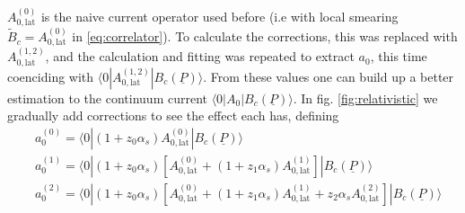 $A_{0,\text{lat}}^{(0)}$ is the naive current operator used before (i.e with local smearing $\tilde{B}_c = A_{0,\text{lat}}^{(0)}$ in \eqref{eq:correlator}). 
To calculate the corrections, 
this was replaced with $A_{0,\text{lat}}^{(1,2)}$, and the calculation and fitting was repeated to extract $a_0$, this time coenciding with 
$\langle 0 | A_{0,\text{lat}}^{(1,2)} | B_c(\underline{P}) \rangle$. From these values one can build up a better estimation to the continuum current 
$\langle 0 | A_0 | B_c(\underline{P}) \rangle$. In fig. \ref{fig:relativistic} we gradually add corrections to see the effect each has, defining
\begin{align}
  \nonumber
  \label{eq:a_0corrections}
  &a_0^{(0)} = \langle 0 | (1+z_0 \alpha_s ) A_{0,\text{lat}}^{(0)} | B_c(\underline{P}) \rangle \\
  &a_0^{(1)} = \langle 0 | (1+z_0 \alpha_s ) \left[ A_{0,\text{lat}}^{(0)} + (1 + z_1\alpha_s) A_{0,\text{lat}}^{(1)} \right] | B_c(\underline{P}) \rangle \\
  \nonumber
  &a_0^{(2)} = \langle 0 | (1+z_0 \alpha_s ) \left[ A_{0,\text{lat}}^{(0)} + (1 + z_1\alpha_s) A_{0,\text{lat}}^{(1)} + z_2\alpha_s A_{0,\text{lat}}^{(2)} \right] | B_c(\underline{P}) \rangle \\
  \nonumber
\end{align}

